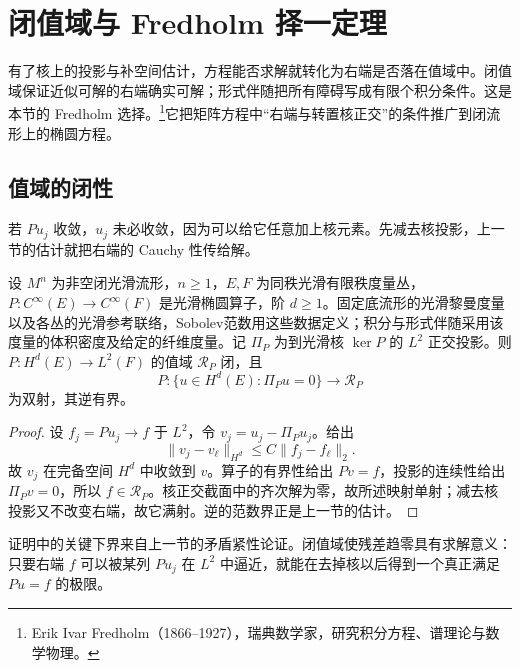
% 
% 

\section{闭值域与 Fredholm 择一定理}
\label{g3:sec:1302}

有了核上的投影与补空间估计，方程能否求解就转化为右端是否落在值域中。闭值域保证近似可解的右端确实可解；形式伴随把所有障碍写成有限个积分条件。这是本节的 Fredholm 选择。\footnote{Erik Ivar Fredholm（1866--1927），瑞典数学家，研究积分方程、谱理论与数学物理。}它把矩阵方程中“右端与转置核正交”的条件推广到闭流形上的椭圆方程。

\subsection{值域的闭性}
\label{g3:subsec:1302:01}
若 \(Pu_j\) 收敛，\(u_j\) 未必收敛，因为可以给它任意加上核元素。先减去核投影，上一节的估计就把右端的 Cauchy 性传给解。

\begin{proposition}\label{g3:prop:elliptic-closed-range}
	设 \(M^n\) 为非空闭光滑流形，\(n\ge1\)，\(E,F\) 为同秩光滑有限秩度量丛，\(P:C^\infty(E)\to C^\infty(F)\) 是光滑椭圆算子，阶 \(d\ge1\)。固定底流形的光滑黎曼度量以及各丛的光滑参考联络，Sobolev范数用这些数据定义；积分与形式伴随采用该度量的体积密度及给定的纤维度量。记 \(\Pi_P\) 为到光滑核 \(\ker P\) 的 \(L^2\) 正交投影。则 \(P:H^d(E)\to L^2(F)\) 的值域 \(\mathcal R_P\) 闭，且
	\[
		P:\{u\in H^d(E):\Pi_Pu=0\}\longrightarrow\mathcal R_P
	\]
	为双射，其逆有界。
\end{proposition}
\begin{proof}
	设 \(f_j=Pu_j\to f\) 于 \(L^2\)，令 \(v_j=u_j-\Pi_Pu_j\)。给出
	\[
		\|v_j-v_\ell\|_{H^d}\le C\|f_j-f_\ell\|_2.
	\]
	故 \(v_j\) 在完备空间 \(H^d\) 中收敛到 \(v\)。算子的有界性给出 \(Pv=f\)，投影的连续性给出 \(\Pi_Pv=0\)，所以 \(f\in\mathcal R_P\)。核正交截面中的齐次解为零，故所述映射单射；减去核投影又不改变右端，故它满射。逆的范数界正是上一节的估计。
\end{proof}

证明中的关键下界来自上一节的矛盾紧性论证。闭值域使残差趋零具有求解意义：只要右端 \(f\) 可以被某列 \(Pu_j\) 在 \(L^2\) 中逼近，就能在去掉核以后得到一个真正满足 \(Pu=f\) 的极限。


